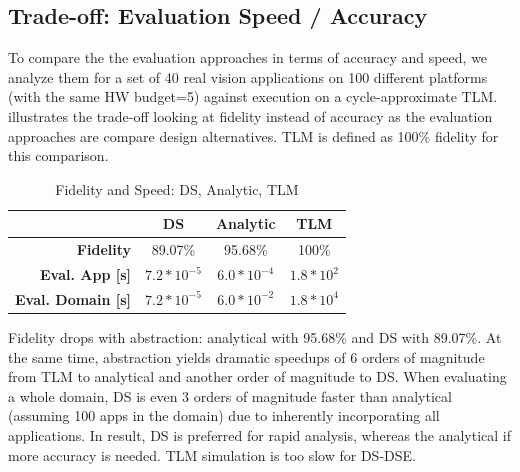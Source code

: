 \subsection{Trade-off: Evaluation Speed / Accuracy }
To compare the the evaluation approaches in terms of accuracy and speed, we analyze them for a set of 40 real vision applications on 100 different platforms (with the same HW budget=5) against execution on a cycle-approximate TLM. %
 illustrates the trade-off looking at fidelity instead of accuracy as the evaluation approaches are compare design alternatives. TLM is defined as 100\% fidelity for this comparison.

\label{sec:eva:sum}
\begin{table}[h]
	\caption{Fidelity and Speed: DS, Analytic, TLM}
	\label{tab:fidelity}
	\begin{tabular}{r||c|c|c}
		\toprule
		  & \textbf{DS}& \textbf{Analytic}& \textbf{TLM}\\
		\hline
		\midrule
		\textbf{Fidelity} & 89.07\%& 95.68\%& 100\%\\
		\hline
		\textbf{Eval. App [s]} & $7.2*10^{-5}$ & $6.0*10^{-4}$ & $1.8*10^2$ \\
		\hline
		\textbf{Eval. Domain [s]} & $7.2*10^{-5}$ & $6.0*10^{-2}$ & $1.8*10^4$ \\
		\bottomrule
	\end{tabular}
\end{table} 

Fidelity drops with abstraction: analytical with 95.68\% and DS with 89.07\%. At the same time, abstraction yields dramatic speedups of 6 orders of magnitude from TLM to analytical and another order of magnitude to DS. When evaluating a whole domain, DS is even 3 orders of magnitude faster than analytical (assuming 100 apps in the domain) due to inherently incorporating all applications. In result, DS is preferred for rapid analysis, whereas the analytical if more accuracy is needed. TLM simulation is too slow for DS-DSE.